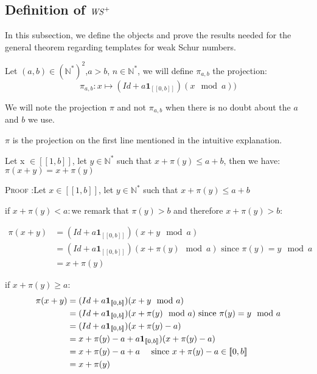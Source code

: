 \subsection{Definition of \(\mathit{WS}^+\)}

In this subsection, we define the objects and prove the results needed for the general theorem regarding templates for
weak Schur numbers.

\begin{definition}

Let \((a,b) \in (\mathbb{N}^*)^2\),\(a>b\), \(n \in \mathbb{N}^*\), we will define \(\pi_{a,b}\) the projection:
\[ \pi_{a,b}:x \longmapsto (Id+a\mathbf{1}_{ [\![0,b]\!]})(x \mod a))\]
\end{definition}

We will note  the projection \(\pi\) and not \(\pi_{a,b}\) when there is no doubt about the \(a\) and \(b\) we use.

\begin{remark}
\(\pi\) is the projection on the first line mentioned in the intuitive explanation.
\end{remark}

\begin{proposition}
Let x \(\in [\![1,b]\!]\), let  \(y \in \mathbb{N}^*\) such that \(x+\pi(y)\leqslant a+b\), then we have: \(\pi(x+y)=x+\pi(y)\)
\end{proposition}

\textsc{Proof :}Let  \(x\in [\![1,b]\!]\), let  \(y\in \mathbb{N}^*\) such that \(x+\pi(y)\leqslant a+b\)

if \(x+\pi(y)< a:\)we remark that \(\pi(y)>b\) and therefore \(x+\pi(y)>b\):

\begin{align*}
 \pi(x+y) & = (Id+a\mathbf{1}_{ [\![0,b]\!]})(x+y \mod a)\\
& = (Id+a\mathbf{1}_{ [\![0,b]\!]})(x+\pi(y) \mod a)\text{ since } \pi(y)=y \mod a \\
& =x+ \pi(y)
\end{align*}

if \(x+\pi(y)\geqslant a\):
\begin{align*}
 \pi(x+y) & = (Id+a\mathbf{1}_{ [\![0,b]\!]})(x+y \mod a)\\
& = (Id+a\mathbf{1}_{ [\![0,b]\!]})(x+\pi(y)\mod a)\text{ since } \pi(y)=y \mod a \\
& = (Id+a\mathbf{1}_{ [\![0,b]\!]})(x+\pi(y) - a) \\
& = x+\pi(y) - a +a\mathbf{1}_{ [\![0,b]\!]})(x+\pi(y) - a) \\
& = x+\pi(y) - a +a \text{ \quad since } x+\pi(y) - a \in [\![0,b]\!] \\
& = x+\pi(y)
\end{align*}


